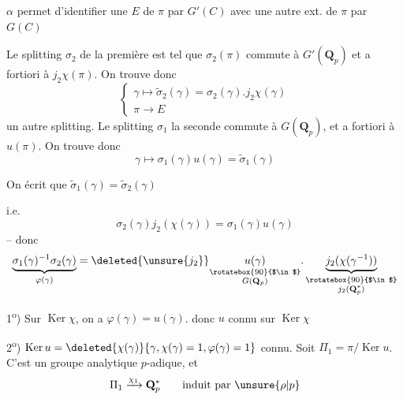  $\alpha$ permet d'identifier une  $E$ de $\pi$ par $G'(C)$ avec une autre ext. de $\pi$ par $G(C)$

Le splitting $\sigma_2$ de la première est tel que $\sigma_2(\pi)$ commute à $G'(\mathbf Q_p)$ et a fortiori à $j_2\chi(\pi)$. On trouve donc
\[
\left\{\begin{array}{l}
\gamma\longmapsto\widetilde\sigma_2(\gamma)=\sigma_2(\gamma).j_2\chi(\gamma)\\
\pi\longrightarrow E
\end{array}\right.
\]
un autre splitting.
Le splitting $\sigma_1$  la seconde commute à $G(\mathbf Q_p)$, et a fortiori à $u(\pi)$. On trouve donc
\[
\gamma\longmapsto\sigma_1(\gamma)u(\gamma)=\widetilde\sigma_1(\gamma)
\]

On écrit que $\widetilde\sigma_1(\gamma)=\widetilde\sigma_2(\gamma)$

i.e.
\[
\sigma_2(\gamma)j_2(\chi(\gamma))=\sigma_1(\gamma)u(\gamma)
\]
-- donc
\[
\underbrace{\sigma_1(\gamma)^{-1}\sigma_2(\gamma)}_{\varphi(\gamma)}
=\deleted{\unsure{j_2}}\underset{\substack{\rotatebox{90}{$\in$}\\G(\mathbf Q_p)}}{u(\gamma)}.
\underbrace{j_2(\chi(\gamma^{-1}))}_{\substack{\rotatebox{90}{$\in$}\\j_2(\mathbf Q_p^*)}}
\]

1\textsuperscript{o}) Sur $\operatorname{Ker}\chi$, on a $\varphi(\gamma)=u(\gamma)$. donc $u$ connu sur $\operatorname{Ker}\chi$

2\textsuperscript{o}) $\operatorname{Ker}u=\deleted{\chi(\gamma)}\{\gamma,\chi(\gamma)=1,\varphi(\gamma)=1\}$ connu. Soit $\Pi_1=\pi/\operatorname{Ker}u$. C'est un groupe analytique $p$-adique, et
\[
\Pi_1\xrightarrow{\chi_1}\mathbf Q_p^*\qquad\text{induit par }\unsure{\rho|p}
\]

